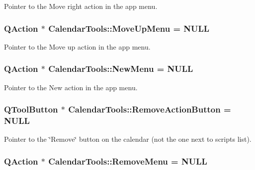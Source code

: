 Pointer to the Move right action in the app menu. 

\hypertarget{struct_calendar_tools_a1cecf21c2b4a9b28c8c75e7dfe6a38c6}{
\subsubsection[{Move\-Up\-Menu}]{\setlength{\rightskip}{0pt plus 5cm}Q\-Action $\ast$ Calendar\-Tools\-::\-Move\-Up\-Menu = N\-U\-L\-L\hspace{0.3cm}{\ttfamily [static]}}}\label{struct_calendar_tools_a1cecf21c2b4a9b28c8c75e7dfe6a38c6}


Pointer to the Move up action in the app menu. 

\hypertarget{struct_calendar_tools_ad4f631aa1cb1476d18ece1e48980b4c8}{
\subsubsection[{New\-Menu}]{\setlength{\rightskip}{0pt plus 5cm}Q\-Action $\ast$ Calendar\-Tools\-::\-New\-Menu = N\-U\-L\-L\hspace{0.3cm}{\ttfamily [static]}}}\label{struct_calendar_tools_ad4f631aa1cb1476d18ece1e48980b4c8}


Pointer to the New action in the app menu. 

\hypertarget{struct_calendar_tools_ab68a7129df2c2d873265d2205bd94de1}{
\subsubsection[{Remove\-Action\-Button}]{\setlength{\rightskip}{0pt plus 5cm}Q\-Tool\-Button $\ast$ Calendar\-Tools\-::\-Remove\-Action\-Button = N\-U\-L\-L\hspace{0.3cm}{\ttfamily [static]}}}\label{struct_calendar_tools_ab68a7129df2c2d873265d2205bd94de1}


Pointer to the \char`\"{}\-Remove\char`\"{} button on the calendar (not the one next to scripts list). 

\hypertarget{struct_calendar_tools_ac969b2f3e0a0b9a6f216775d98e1fa6b}{
\subsubsection[{Remove\-Menu}]{\setlength{\rightskip}{0pt plus 5cm}Q\-Action $\ast$ Calendar\-Tools\-::\-Remove\-Menu = N\-U\-L\-L\hspace{0.3cm}{\ttfamily [static]}}}\label{struct_calendar_tools_ac969b2f3e0a0b9a6f216775d98e1fa6b}


